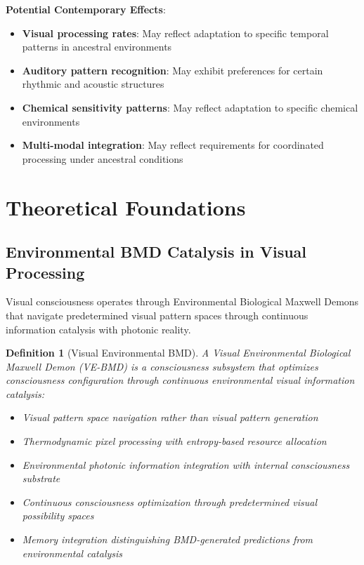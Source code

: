 \documentclass[12pt,a4paper]{article}
\newtheorem{definition}[theorem]{Definition}
\begin{document}
\textbf{Potential Contemporary Effects}:
\begin{itemize}
\item \textbf{Visual processing rates}: May reflect adaptation to specific temporal patterns in ancestral environments
\item \textbf{Auditory pattern recognition}: May exhibit preferences for certain rhythmic and acoustic structures
\item \textbf{Chemical sensitivity patterns}: May reflect adaptation to specific chemical environments
\item \textbf{Multi-modal integration}: May reflect requirements for coordinated processing under ancestral conditions
\end{itemize}

\section{Theoretical Foundations}

\subsection{Environmental BMD Catalysis in Visual Processing}

Visual consciousness operates through Environmental Biological Maxwell Demons that navigate predetermined visual pattern spaces through continuous information catalysis with photonic reality.

\begin{definition}[Visual Environmental BMD]
A Visual Environmental Biological Maxwell Demon (VE-BMD) is a consciousness subsystem that optimizes consciousness configuration through continuous environmental visual information catalysis:
\begin{itemize}
\item Visual pattern space navigation rather than visual pattern generation
\item Thermodynamic pixel processing with entropy-based resource allocation
\item Environmental photonic information integration with internal consciousness substrate
\item Continuous consciousness optimization through predetermined visual possibility spaces
\item Memory integration distinguishing BMD-generated predictions from environmental catalysis
\end{itemize}
\end{definition}
\end{document}
